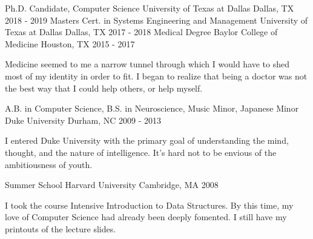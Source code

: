 \begin{cventries}
    \cventry
        {Ph.D. Candidate, Computer Science}
        {University of Texas at Dallas}
        {Dallas, TX}
        {2018 - 2019}
        {
        }
    \cventry
        {Masters Cert. in Systems Engineering and Management}
        {University of Texas at Dallas}
        {Dallas, TX}
        {2017 - 2018}
        {
        }
    \cventry
        {Medical Degree}
        {Baylor College of Medicine}
        {Houston, TX}
        {2015 - 2017}
        {
            \begin{cvparagraph}
                Medicine seemed to me a narrow tunnel through which I would have to shed most of my identity in order to fit. I began to realize that being a doctor was not the best way that I could help others, or help myself.
            \end{cvparagraph}
        }
    \cventry
        {A.B. in Computer Science, B.S. in Neuroscience, Music Minor, Japanese Minor}
        {Duke University}
        {Durham, NC}
        {2009 - 2013}
        {
            \begin{cvparagraph}
                I entered Duke University with the primary goal of understanding the mind, thought, and the nature of intelligence. It's hard not to be envious of the ambitiousness of youth.
            \end{cvparagraph}
        }
    \cventry
        {Summer School}
        {Harvard University}
        {Cambridge, MA}
        {2008}
        {
            \begin{cvparagraph}
                I took the course Intensive Introduction to Data Structures. By this time, my love of Computer Science had already been deeply fomented. I still have my printouts of the lecture slides.
            \end{cvparagraph}
        }
\end{cventries}
